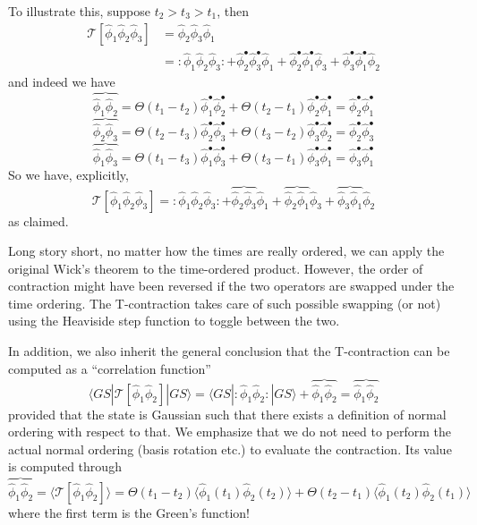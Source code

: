 To illustrate this, suppose $t_2>t_3>t_1$, then
\begin{align*}
    \mathcal{T} \left[ \hat{\phi}_1\hat{\phi}_2\hat{\phi}_3 \right] &=\hat{\phi}_2\hat{\phi}_3\hat{\phi}_1\\
    &=:\hat{\phi}_1\hat{\phi}_2\hat{\phi}_3:+\hat{\phi}_{2}^{\bullet}\hat{\phi}_{3}^{\bullet}\hat{\phi}_1+\hat{\phi}_{2}^{\bullet}\hat{\phi}_{1}^{\bullet}\hat{\phi}_3+\hat{\phi}_{3}^{\bullet}\hat{\phi}_{1}^{\bullet}\hat{\phi}_2
\end{align*}
and indeed we have
\[ \overbrace{\hat{\phi}_1\hat{\phi}_2}=\Theta \left( t_1-t_2 \right) \hat{\phi}_{1}^{\bullet}\hat{\phi}_{2}^{\bullet}+\Theta \left( t_2-t_1 \right) \hat{\phi}_{2}^{\bullet}\hat{\phi}_{1}^{\bullet}=\hat{\phi}_{2}^{\bullet}\hat{\phi}_{1}^{\bullet}\]
\[ \overbrace{\hat{\phi}_2\hat{\phi}_3}=\Theta \left( t_2-t_3 \right) \hat{\phi}_{2}^{\bullet}\hat{\phi}_{3}^{\bullet}+\Theta \left( t_3-t_2 \right) \hat{\phi}_{3}^{\bullet}\hat{\phi}_{2}^{\bullet}=\hat{\phi}_{2}^{\bullet}\hat{\phi}_{3}^{\bullet}\]
\[ \overbrace{\hat{\phi}_1\hat{\phi}_3}=\Theta \left( t_1-t_3 \right) \hat{\phi}_{1}^{\bullet}\hat{\phi}_{3}^{\bullet}+\Theta \left( t_3-t_1 \right) \hat{\phi}_{3}^{\bullet}\hat{\phi}_{1}^{\bullet}=\hat{\phi}_{3}^{\bullet}\hat{\phi}_{1}^{\bullet}\]
So we have, explicitly,
\[ \mathcal{T} \left[ \hat{\phi}_1\hat{\phi}_2\hat{\phi}_3 \right] =:\hat{\phi}_1\hat{\phi}_2\hat{\phi}_3:+\overbrace{\hat{\phi}_2\hat{\phi}_3}\hat{\phi}_1+\overbrace{\hat{\phi}_2\hat{\phi}_1}\hat{\phi}_3+\overbrace{\hat{\phi}_3\hat{\phi}_1}\hat{\phi}_2\]
as claimed.

Long story short, no matter how the times are really ordered, we can apply the original Wick's theorem to the time-ordered product. However, the order of contraction might have been reversed if the two operators are swapped under the time ordering. The T-contraction takes care of such possible swapping (or not) using the Heaviside step function to toggle between the two.

In addition, we also inherit the general conclusion that the T-contraction can be computed as a ``correlation function''
\[ \langle GS|\mathcal{T} \left[ \hat{\phi}_1\hat{\phi}_2 \right] |GS\rangle =\langle GS|:\hat{\phi}_1\hat{\phi}_2:|GS\rangle +\overbrace{\hat{\phi}_1\hat{\phi}_2}=\overbrace{\hat{\phi}_1\hat{\phi}_2}\]
provided that the state is Gaussian such that there exists a definition of normal ordering with respect to that. We emphasize that we do not need to perform the actual normal ordering (basis rotation etc.) to evaluate the contraction. Its value is computed through
\[ \overbrace{\hat{\phi}_1\hat{\phi}_2}=\langle \mathcal{T} \left[ \hat{\phi}_1\hat{\phi}_2 \right] \rangle =\Theta \left( t_1-t_2 \right) \langle \hat{\phi}_1\left( t_1 \right) \hat{\phi}_2\left( t_2 \right) \rangle +\Theta \left( t_2-t_1 \right) \langle \hat{\phi}_1\left( t_2 \right) \hat{\phi}_2\left( t_1 \right) \rangle \]
where the first term is the Green's function!

